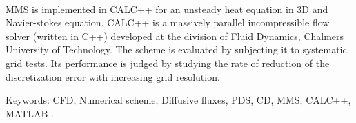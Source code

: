 \\
\hspace{0.25cm}MMS is implemented in CALC++ for an unsteady heat equation in 3D and Navier-stokes equation. CALC++ is a massively parallel incompressible flow solver (written in C++) developed at the division of Fluid Dynamics, Chalmers University of Technology. The scheme is evaluated by subjecting it to systematic grid tests. Its performance is judged by studying the rate of reduction of the discretization error with increasing grid resolution.

\vfill
Keywords: CFD, Numerical scheme, Diffusive fluxes, PDS, CD, MMS, CALC++, MATLAB .

\newpage                %
\thispagestyle{empty}
\mbox{}